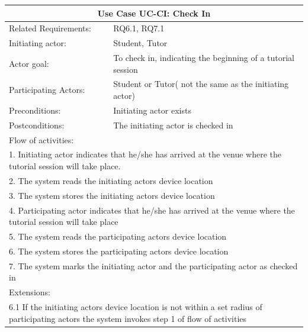 \documentclass[12pt]{article}
\begin{document}
{		\begin{tabular}{| l | p{10cm}| }
			\hline\multicolumn{2}{|c|}{ \textbf{Use Case UC-CI: Check In } }\\ \hline
			Related Requirements: &  RQ6.1, RQ7.1\\ \hline
			Initiating actor: & Student, Tutor \\ \hline
			Actor goal: & To check in, indicating the beginning of a tutorial session\\ \hline
			Participating Actors: & Student or Tutor( not the same as the initiating actor)\\ \hline
			Preconditions: &Initiating actor exists\\ \hline
			Postconditions: & The initiating actor is checked in\\ \hline
			\multicolumn{2}{|l|}{Flow of activities:}\\ \hline
			\multicolumn{2}{|p{15cm}|}{1. Initiating actor indicates that he/she has arrived at the venue where the tutorial session will take place.}\\
			\multicolumn{2}{|p{15cm}|}{2. The system reads the initiating actors device location}\\
			\multicolumn{2}{|p{15cm}|}{3. The system stores the initiating actors device location}\\
			\multicolumn{2}{|p{15cm}|}{4. Participating actor indicates that he/she has arrived at the venue where the tutorial session will take place}\\
			\multicolumn{2}{|l|}{5. The system reads the participating actors device location}\\
			\multicolumn{2}{|l|}{6. The system stores the participating actors device location}\\
			\multicolumn{2}{|l|}{7. The system marks the initiating actor and the participating actor as checked in}\\
			\hline
			\multicolumn{2}{|l|}{Extensions: }\\ \hline
			\multicolumn{2}{|p{15cm}|}{6.1 If the initiating actors device location is not within a set radius of participating actors the system invokes step 1 of flow of activities }\\
			\hline
		\end{tabular}

}
\end{document}
